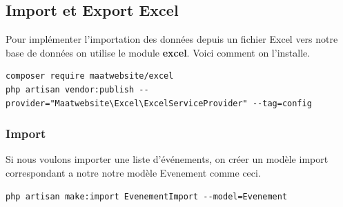 \documentclass[12pt,a4paper]{article}
\begin{document}
\subsection{Import et Export Excel}
Pour implémenter l'importation des données depuis un fichier Excel vers notre base de données on utilise le
module \textbf{excel}. Voici comment on l'installe.

\begin{verbatim}
composer require maatwebsite/excel
php artisan vendor:publish --provider="Maatwebsite\Excel\ExcelServiceProvider" --tag=config
\end{verbatim}

\subsubsection{Import}
Si nous voulons importer une liste d'événements, on créer un modèle import correspondant a notre
notre modèle Evenement comme ceci.

\begin{verbatim}
php artisan make:import EvenementImport --model=Evenement
\end{verbatim}
\end{document}

